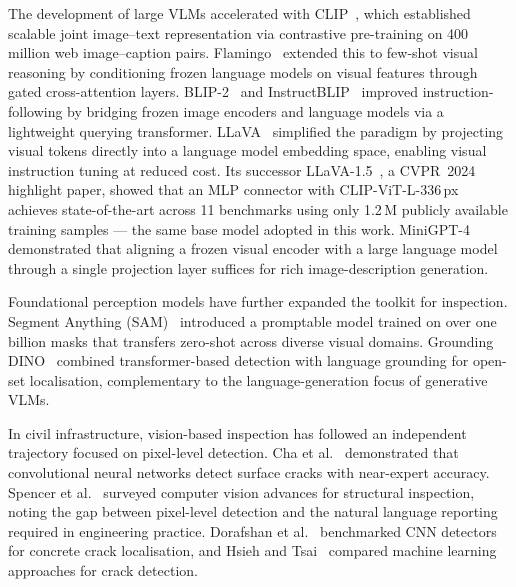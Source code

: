 \documentclass[twocolumn]{article}
\begin{document}
The development of large VLMs accelerated with CLIP~\cite{radford2021clip},
which established scalable joint image--text representation via contrastive
pre-training on 400 million web image--caption pairs.
Flamingo~\cite{alayrac2022flamingo} extended this to few-shot visual reasoning
by conditioning frozen language models on visual features through gated
cross-attention layers.
BLIP-2~\cite{li2023blip2} and InstructBLIP~\cite{dai2023instructblip} improved
instruction-following by bridging frozen image encoders and language models
via a lightweight querying transformer.
LLaVA~\cite{liu2024llava} simplified the paradigm by projecting visual tokens
directly into a language model embedding space, enabling visual instruction
tuning at reduced cost.
Its successor LLaVA-1.5~\cite{liu2024llava15}, a CVPR~2024 highlight paper,
showed that an MLP connector with CLIP-ViT-L-336\,px achieves state-of-the-art
across 11 benchmarks using only 1.2\,M publicly available training samples
--- the same base model adopted in this work.
MiniGPT-4~\cite{zhu2024minigpt4} demonstrated that aligning a frozen visual
encoder with a large language model through a single projection layer suffices
for rich image-description generation.

Foundational perception models have further expanded the toolkit for inspection.
Segment Anything (SAM)~\cite{kirillov2023sam} introduced a promptable model
trained on over one billion masks that transfers zero-shot across diverse
visual domains.
Grounding DINO~\cite{liu2023groundingdino} combined transformer-based detection
with language grounding for open-set localisation, complementary to the
language-generation focus of generative VLMs.

In civil infrastructure, vision-based inspection has followed an independent
trajectory focused on pixel-level detection.
Cha et al.~\cite{cha2017deepcrack} demonstrated that convolutional neural
networks detect surface cracks with near-expert accuracy.
Spencer et al.~\cite{spencer2019vision} surveyed computer vision advances for
structural inspection, noting the gap between pixel-level detection and the
natural language reporting required in engineering practice.
Dorafshan et al.~\cite{dorafshan2018concrete} benchmarked CNN detectors for
concrete crack localisation, and Hsieh and Tsai~\cite{hsieh2020concrete}
compared machine learning approaches for crack detection.
\end{document}
